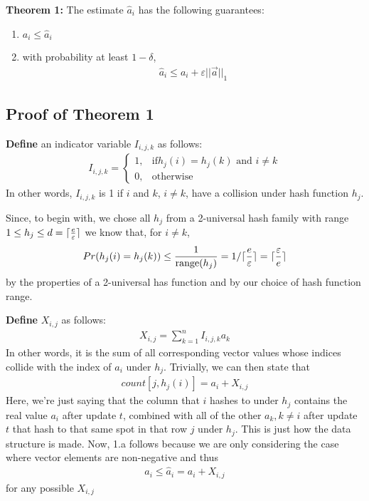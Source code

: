 \documentclass[11pt]{article}
\DeclarePairedDelimiter\ceil{\lceil}{\rceil}
\begin{document}
\textbf{Theorem 1:} The estimate $\hat a_i$ has the following guarantees:
\begin{enumerate}[label=\textnormal{(\arabic*)}]
    \item $a_i \leq \hat{a}_i$
    \item with probability at least $1 - \delta$, 
    \begin{align}
        \hat{a}_i \leq a_i + \varepsilon ||\vec{a}||_1 
    \end{align}
\end{enumerate}
\subsection{Proof of Theorem 1}
\textbf{Define} an indicator variable $I_{i, j, k}$ as follows:
\begin{align}
    I_{i, j, k} = 
    \begin{cases}
        1, & \text{if} h_j(i) = h_j(k) \text{ and } i \neq k \\
        0, & \text{otherwise}
    \end{cases}
\end{align}
In other words, $I_{i, j, k}$ is 1 if $i$ and $k$, $i \neq k$, have
a collision under hash function $h_j$.

Since, to begin with, we chose all $h_j$ from a 2-universal hash family
with range $1 \leq h_j \leq d = \ceil{\frac{e}{\varepsilon}}$ 
we know that, for $i \neq k$,
\begin{align}\label{eq:collision-prob}
    Pr(h_j(i) = h_j(k)) \leq \frac{1}{\text{range}(h_j)} = 1/\ceil{\frac{e}{\varepsilon}} = \ceil{\frac{\varepsilon}{e}}
\end{align}
by the properties of a 2-universal has function and by our choice of hash function
range.

\textbf{Define} $X_{i, j}$ as follows:
\begin{align}
    X_{i, j} = \sum_{k = 1}^{n}I_{i, j, k} a_k
\end{align}
In other words, it is the sum of all corresponding vector values whose indices
collide with the index of $a_i$ under $h_j$. Trivially, we can then state that
\begin{align}\label{eq:count-def}
    count[j, h_j(i)] = a_i + X_{i, j} 
\end{align}
Here, we're just saying that the column that $i$ hashes to under $h_j$
contains the real value $a_i$ after update $t$, combined with all of the other
$a_k, k \neq i$ after update $t$ that hash to that same spot in that row $j$ under
$h_j$. This is just how the data structure is made.  Now, 1.a follows because
we are only considering the case where vector elements are non-negative and thus
\begin{align}
    a_i \leq \hat a_i = a_i + X_{i, j}
\end{align}
for any possible $X_{i, j}$
\end{document}
